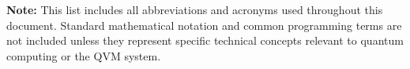 \begin{longtable}{|p{3cm}|p{10cm}|}
\end{longtable}

\vspace{0.5cm}

\noindent\textbf{Note:} This list includes all abbreviations and acronyms used throughout this document. Standard mathematical notation and common programming terms are not included unless they represent specific technical concepts relevant to quantum computing or the QVM system.
